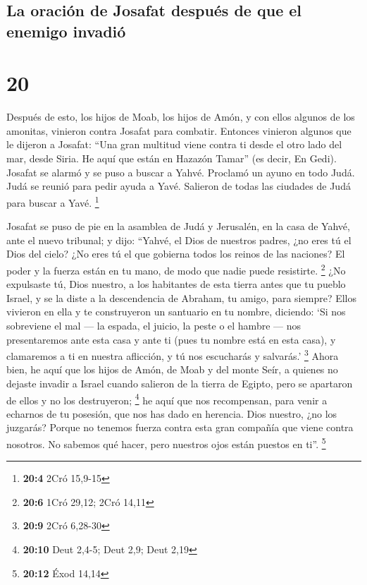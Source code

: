 \hypertarget{la-oraciuxf3n-de-josafat-despuuxe9s-de-que-el-enemigo-invadiuxf3}{%
\subsection{La oración de Josafat después de que el enemigo
invadió}\label{la-oraciuxf3n-de-josafat-despuuxe9s-de-que-el-enemigo-invadiuxf3}}

\hypertarget{section-19}{%
\section{20}\label{section-19}}

 Después de esto, los hijos de Moab, los hijos de Amón, y
con ellos algunos de los amonitas, vinieron contra Josafat para
combatir.  Entonces vinieron algunos que le dijeron a
Josafat: ``Una gran multitud viene contra ti desde el otro lado del mar,
desde Siria. He aquí que están en Hazazón Tamar'' (es decir, En Gedi).
 Josafat se alarmó y se puso a buscar a Yahvé. Proclamó un
ayuno en todo Judá.  Judá se reunió para pedir ayuda a
Yavé. Salieron de todas las ciudades de Judá para buscar a Yavé.
\footnote{\textbf{20:4} 2Cró 15,9-15}

 Josafat se puso de pie en la asamblea de Judá y
Jerusalén, en la casa de Yahvé, ante el nuevo tribunal;  y
dijo: ``Yahvé, el Dios de nuestros padres, ¿no eres tú el Dios del
cielo? ¿No eres tú el que gobierna todos los reinos de las naciones? El
poder y la fuerza están en tu mano, de modo que nadie puede resistirte.
\footnote{\textbf{20:6} 1Cró 29,12; 2Cró 14,11}  ¿No
expulsaste tú, Dios nuestro, a los habitantes de esta tierra antes que
tu pueblo Israel, y se la diste a la descendencia de Abraham, tu amigo,
para siempre?  Ellos vivieron en ella y te construyeron un
santuario en tu nombre, diciendo:  `Si nos sobreviene el
mal --- la espada, el juicio, la peste o el hambre --- nos presentaremos
ante esta casa y ante ti (pues tu nombre está en esta casa), y
clamaremos a ti en nuestra aflicción, y tú nos escucharás y salvarás.'
\footnote{\textbf{20:9} 2Cró 6,28-30}  Ahora bien, he
aquí que los hijos de Amón, de Moab y del monte Seír, a quienes no
dejaste invadir a Israel cuando salieron de la tierra de Egipto, pero se
apartaron de ellos y no los destruyeron; \footnote{\textbf{20:10} Deut
  2,4-5; Deut 2,9; Deut 2,19}  he aquí que nos
recompensan, para venir a echarnos de tu posesión, que nos has dado en
herencia.  Dios nuestro, ¿no los juzgarás? Porque no
tenemos fuerza contra esta gran compañía que viene contra nosotros. No
sabemos qué hacer, pero nuestros ojos están puestos en ti''. \footnote{\textbf{20:12}
  Éxod 14,14}


